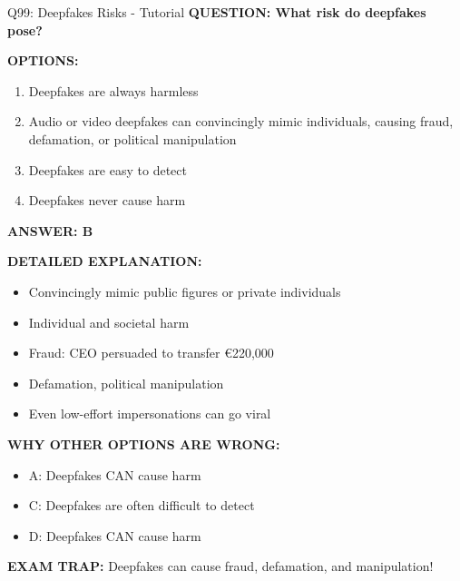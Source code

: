 \documentclass[8pt]{beamer}
\begin{document}
	\begin{frame}{Q99: Deepfakes Risks - Tutorial}
		\fontsize{6.5}{7.5}\selectfont
		\textbf{QUESTION: What risk do deepfakes pose?}
		
		\vspace{0.1cm}
		\textbf{OPTIONS:}
		\begin{enumerate}
			\item Deepfakes are always harmless
			\item Audio or video deepfakes can convincingly mimic individuals, causing fraud, defamation, or political manipulation
			\item Deepfakes are easy to detect
			\item Deepfakes never cause harm
		\end{enumerate}
		
		\vspace{0.1cm}
		\textcolor{myblue}{\textbf{ANSWER: B}}
		
		\vspace{0.1cm}
		\textbf{DETAILED EXPLANATION:}
		\begin{itemize}
			\item Convincingly mimic public figures or private individuals
			\item Individual and societal harm
			\item Fraud: CEO persuaded to transfer €220,000
			\item Defamation, political manipulation
			\item Even low-effort impersonations can go viral
		\end{itemize}
		
		\vspace{0.1cm}
		\textcolor{myred}{\textbf{WHY OTHER OPTIONS ARE WRONG:}}
		\begin{itemize}
			\item \textcolor{myred}{A:} Deepfakes CAN cause harm
			\item \textcolor{myred}{C:} Deepfakes are often difficult to detect
			\item \textcolor{myred}{D:} Deepfakes CAN cause harm
		\end{itemize}
		
		\textcolor{myred}{\textbf{EXAM TRAP:}} Deepfakes can \textcolor{myblue}{cause fraud, defamation, and manipulation}!
	\end{frame}
	
\end{document}
